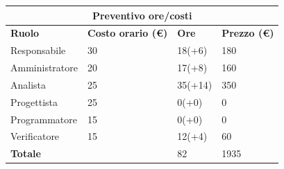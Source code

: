 \documentclass[a4paper, 12pt]{article}
\begin{document}
\begin{center}
	\begin{tabularx}{\textwidth}{|X|X|X|X|}
		\hline
		\multicolumn{4}{|c|}{\textbf{Preventivo ore/costi}}                                      \\
		\hline
		\hline
		\textbf{Ruolo}  & \textbf{Costo orario (\euro)} & \textbf{Ore} & \textbf{Prezzo (\euro)} \\
		\hline
		Responsabile    & 30                            & 18(+6)       & 180                     \\
		\hline
		Amministratore  & 20                            & 17(+8)       & 160                     \\
		\hline
		Analista        & 25                            & 35(+14)      & 350                     \\
		\hline
		Progettista     & 25                            & 0(+0)        & 0                       \\
		\hline
		Programmatore   & 15                            & 0(+0)        & 0                       \\
		\hline
		Verificatore    & 15                            & 12(+4)       & 60                      \\
		\hline
		\hline
		\textbf{Totale} &                               & 82           & 1935                    \\
		\hline
	\end{tabularx}\\[8pt]
	\mbox{}\\
\end{center}
\end{document}
